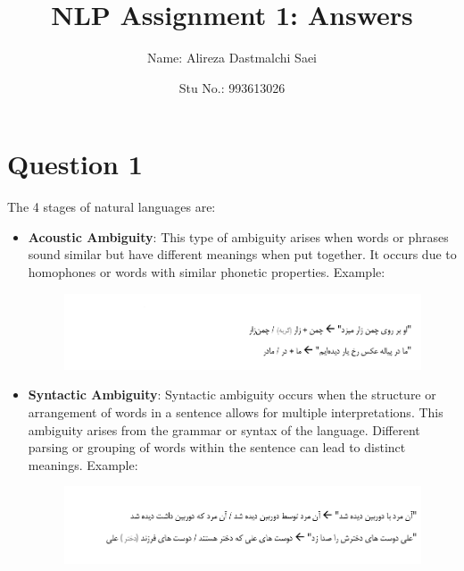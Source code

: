 \documentclass{article}
\title{\textbf{\Huge NLP Assignment 1: Answers}}
\author{Name: Alireza Dastmalchi Saei}
\date{Stu No.: 993613026}
\begin{document}
\maketitle

\pagebreak

\section{Question 1}
The 4 stages of natural languages are:
\begin{itemize}
    \item \textbf{Acoustic Ambiguity}: This type of ambiguity arises when words or phrases sound similar but have different meanings when put together. It occurs due to homophones or words with similar phonetic properties. Example:
        
        \begin{figure}[h]
          \centering
          \includegraphics[width=1\textwidth]{Images/Acoustic.png}
          \label{fig:model_diagram}
        \end{figure}

    \item \textbf{Syntactic Ambiguity}: Syntactic ambiguity occurs when the structure or arrangement of words in a sentence allows for multiple interpretations. This ambiguity arises from the grammar or syntax of the language. Different parsing or grouping of words within the sentence can lead to distinct meanings. Example:
        \begin{figure}[h]
          \centering
          \includegraphics[width=1\textwidth]{Images/Syntactic.png}
          \label{fig:model_diagram}
        \end{figure}


\end{itemize}
\end{document}
